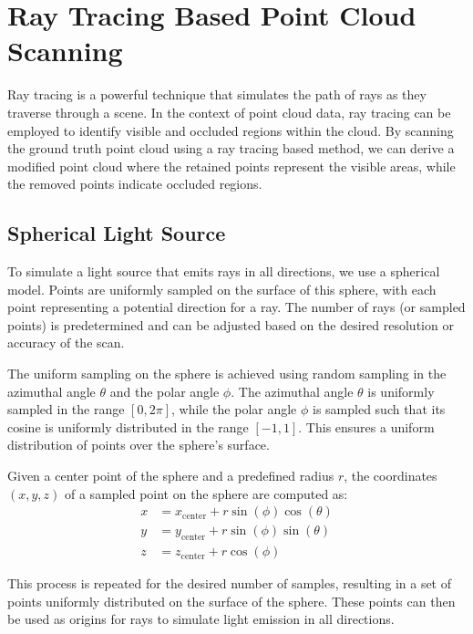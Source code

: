 \documentclass[11pt, a4paper,oneside,chapterprefix=false]{scrbook}
\begin{document}
\section{Ray Tracing Based Point Cloud Scanning} \label{sec:ray tracing point cloud scanning}

Ray tracing is a powerful technique that simulates the path of rays as they traverse through a scene. In the context of point cloud data, ray tracing can be employed to identify visible and occluded regions within the cloud. By scanning the ground truth point cloud using a ray tracing based method, we can derive a modified point cloud where the retained points represent the visible areas, while the removed points indicate occluded regions.

\subsection{Spherical Light Source}

To simulate a light source that emits rays in all directions, we use a spherical model. Points are uniformly sampled on the surface of this sphere, with each point representing a potential direction for a ray. The number of rays (or sampled points) is predetermined and can be adjusted based on the desired resolution or accuracy of the scan.

The uniform sampling on the sphere is achieved using random sampling in the azimuthal angle \( \theta \) and the polar angle \( \phi \). The azimuthal angle \( \theta \) is uniformly sampled in the range \([0, 2\pi]\), while the polar angle \( \phi \) is sampled such that its cosine is uniformly distributed in the range \([-1, 1]\). This ensures a uniform distribution of points over the sphere's surface.

Given a center point of the sphere and a predefined radius \( r \), the coordinates \( (x, y, z) \) of a sampled point on the sphere are computed as:
\begin{align*}
x &= x_{\text{center}} + r \sin(\phi) \cos(\theta) \\
y &= y_{\text{center}} + r \sin(\phi) \sin(\theta) \\
z &= z_{\text{center}} + r \cos(\phi)
\end{align*}

This process is repeated for the desired number of samples, resulting in a set of points uniformly distributed on the surface of the sphere. These points can then be used as origins for rays to simulate light emission in all directions.
\end{document}
